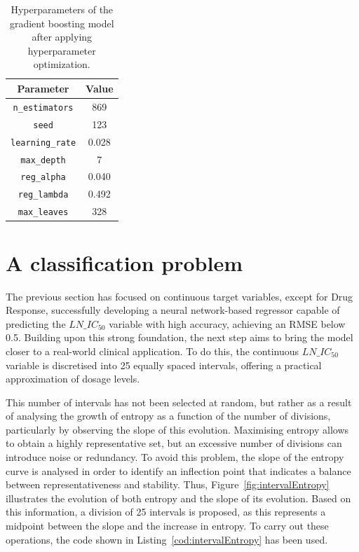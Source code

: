 \begin{table}[H]
    \centering
    \begin{tabular}{|c|c|}
    \hline
    \textbf{Parameter} & \textbf{Value} \\
    \hline
    \texttt{n\_estimators} & 869 \\
    \texttt{seed} & 123 \\
    \texttt{learning\_rate} & 0.028 \\
    \texttt{max\_depth} & 7 \\
    \texttt{reg\_alpha} & 0.040 \\
    \texttt{reg\_lambda} & 0.492 \\
    \texttt{max\_leaves} & 328 \\
    \hline
    \end{tabular}
    \caption{Hyperparameters of the gradient boosting model after applying hyperparameter optimization.}
    \label{tab:gbm_params}
\end{table}

\section{A classification problem}

The previous section has focused on continuous target variables, except for Drug Response, successfully developing a neural network-based regressor capable of predicting the \(LN\_IC_{50}\) variable with high accuracy, achieving an RMSE below 0.5. Building upon this strong foundation, the next step aims to bring the model closer to a real-world clinical application. To do this, the continuous \(LN\_IC_{50}\) variable is discretised into 25 equally spaced intervals, offering a practical approximation of dosage levels. 

This number of intervals has not been selected at random, but rather as a result of analysing the growth of entropy as a function of the number of divisions, particularly by observing the slope of this evolution. Maximising entropy allows to obtain a highly representative set, but an excessive number of divisions can introduce noise or redundancy. To avoid this problem, the slope of the entropy curve is analysed in order to identify an inflection point that indicates a balance between representativeness and stability. Thus, Figure~\ref{fig:intervalEntropy} illustrates the evolution of both entropy and the slope of its evolution. Based on this information, a division of 25 intervals is proposed, as this represents a midpoint between the slope and the increase in entropy. To carry out these operations, the code shown in Listing~\ref{cod:intervalEntropy} has been used.

